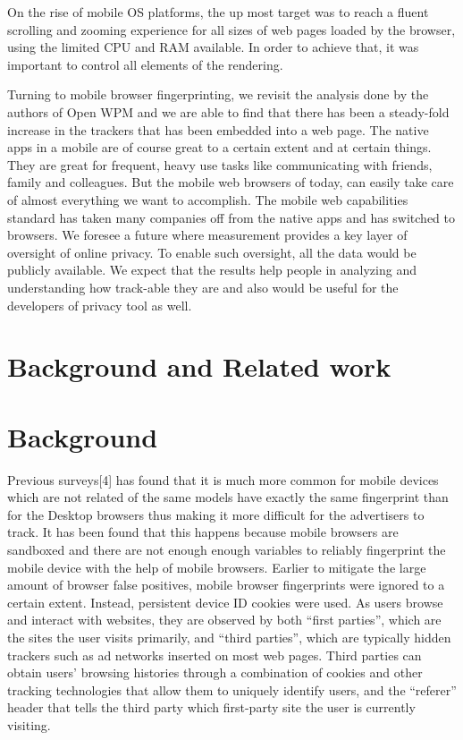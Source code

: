 \documentclass[journal]{IEEEtran}
\begin{document}
On the rise of mobile OS platforms, the up most target was to reach a fluent
scrolling and zooming experience for all sizes of web pages loaded by the
browser, using the limited CPU and RAM available. In order to achieve that, it
was important to control all elements of the rendering.


Turning to mobile browser fingerprinting, we revisit the analysis done by the
authors of Open WPM and we are able to find that there has been a steady-fold
increase in the trackers that has been embedded into a web page. The native apps
in a mobile are of course great to a certain extent and at certain things. They
are great for frequent, heavy use tasks like communicating with friends, family
and colleagues. But the mobile web browsers of today, can easily take care of
almost everything we want to accomplish. The mobile web capabilities standard
has taken many companies off from the native apps and has switched to browsers. 
We foresee a future where measurement provides a key layer of oversight of
online privacy. To enable such oversight, all the data would be publicly
available. We expect that the results help people in analyzing and
understanding how track-able they are and also would be useful for the developers of privacy tool as well.




\section{Background and Related work}
\section*{Background}
Previous surveys[4] has found that it is much more common for mobile devices
which are not related of the same models have exactly the same fingerprint than
for the Desktop browsers thus making it more difficult for the advertisers to
track. It has been found that this happens because mobile browsers are sandboxed
and there are not enough enough variables to reliably fingerprint the mobile
device with the help of mobile browsers. Earlier to mitigate the large amount of
browser false positives, mobile browser fingerprints were ignored to a certain
extent. Instead, persistent device ID cookies were used. As users browse and
interact with websites, they are observed by both “first parties”, which are the
sites the user visits primarily, and “third parties”, which are typically hidden
trackers such as ad networks inserted on most web pages. Third parties can
obtain users’ browsing histories through a combination of cookies and other
tracking technologies that allow them to uniquely identify users, and the
“referer” header that tells the third party which first-party site the user is
currently visiting.
\end{document}
